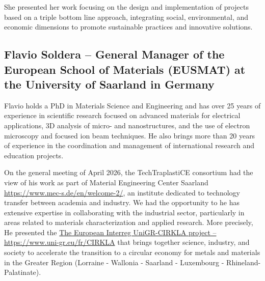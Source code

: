 \documentclass[
  12pt,
  oneside]{book}
\begin{document}
She presented her work focusing on the design and implementation of
projects based on a triple bottom line approach, integrating social,
environmental, and economic dimensions to promote sustainable practices
and innovative solutions.

\subsection{Flavio Soldera -- General Manager of the European School of
Materials (EUSMAT) at the University of Saarland in
Germany}\label{flavio-soldera-general-manager-of-the-european-school-of-materials-eusmat-at-the-university-of-saarland-in-germany}

Flavio holds a PhD in Materials Science and Engineering and has over 25
years of experience in scientific research focused on advanced materials
for electrical applications, 3D analysis of micro- and nanostructures,
and the use of electron microscopy and focused ion beam techniques. He
also brings more than 20 years of experience in the coordination and
management of international research and education projects.

On the general meeting of April 2026, the TechTraplastiCE consortium had
the view of his work as part of Material Engineering Center Saarland
\url{https://www.mec-s.de/en/welcome-2/}, an institute dedicated to
technology transfer between academia and industry. We had the
opportunity to he has extensive expertise in collaborating with the
industrial sector, particularly in areas related to materials
characterization and applied research. More precisely, He presented the
\href{https://www.uni-gr.eu/fr/CIRKLA}{The European Interreg
UniGR-CIRKLA project -- https://www.uni-gr.eu/fr/CIRKLA} that brings
together science, industry, and society to accelerate the transition to
a circular economy for metals and materials in the Greater Region
(Lorraine - Wallonia - Saarland - Luxembourg - Rhineland-Palatinate).
\end{document}
